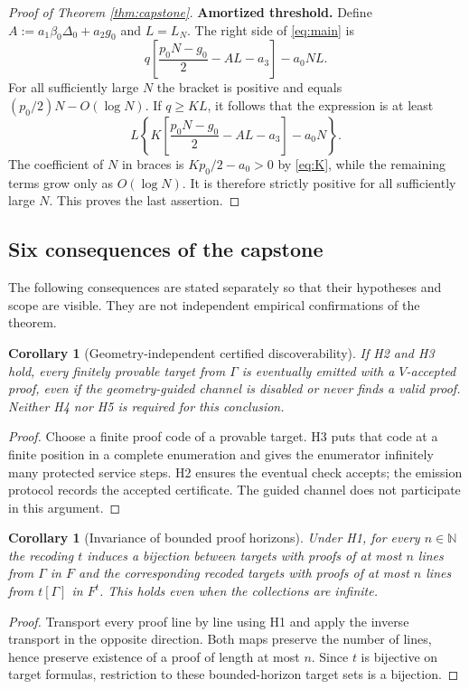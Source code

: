 \documentclass[11pt,letterpaper]{article}
\newtheorem{corollary}[theorem]{Corollary}
\theoremstyle{definition}
\theoremstyle{remark}
\newcommand{\N}{\mathbb{N}}
\begin{document}
\begin{proof}[Proof of Theorem \ref{thm:capstone}]
\medskip\noindent\textbf{Amortized threshold.}
Define $A:=a_1\beta_0\Delta_0+a_2g_0$ and $L=L_N$. The right side of \eqref{eq:main} is
\[
 q\left[\frac{p_0N-g_0}{2}-AL-a_3\right]-a_0NL.
\]
For all sufficiently large $N$ the bracket is positive and equals $(p_0/2)N-O(\log N)$. If $q\ge K L$, it follows that the expression is at least
\[
 L\left\{K\left[\frac{p_0N-g_0}{2}-AL-a_3\right]-a_0N\right\}.
\]
The coefficient of $N$ in braces is $Kp_0/2-a_0>0$ by \eqref{eq:K}, while the remaining terms grow only as $O(\log N)$. It is therefore strictly positive for all sufficiently large $N$. This proves the last assertion.
\end{proof}


\subsection{Six consequences of the capstone}\label{subsec:capstone-corollaries}
\noindent The following consequences are stated separately so that their hypotheses and scope are visible. They are not independent empirical confirmations of the theorem.

\begin{corollary}[Geometry-independent certified discoverability]\label{cor:protected}
If H2 and H3 hold, every finitely provable target from $\Gamma$ is eventually emitted with a $V$-accepted proof, even if the geometry-guided channel is disabled or never finds a valid proof. Neither H4 nor H5 is required for this conclusion.
\end{corollary}
\begin{proof}
Choose a finite proof code of a provable target. H3 puts that code at a finite position in a complete enumeration and gives the enumerator infinitely many protected service steps. H2 ensures the eventual check accepts; the emission protocol records the accepted certificate. The guided channel does not participate in this argument.
\end{proof}

\begin{corollary}[Invariance of bounded proof horizons]\label{cor:horizon}
Under H1, for every $n\in\N$ the recoding $t$ induces a bijection between targets with proofs of at most $n$ lines from $\Gamma$ in $F$ and the corresponding recoded targets with proofs of at most $n$ lines from $t[\Gamma]$ in $F^t$. This holds even when the collections are infinite.
\end{corollary}
\begin{proof}
Transport every proof line by line using H1 and apply the inverse transport in the opposite direction. Both maps preserve the number of lines, hence preserve existence of a proof of length at most $n$. Since $t$ is bijective on target formulas, restriction to these bounded-horizon target sets is a bijection.
\end{proof}
\end{document}
